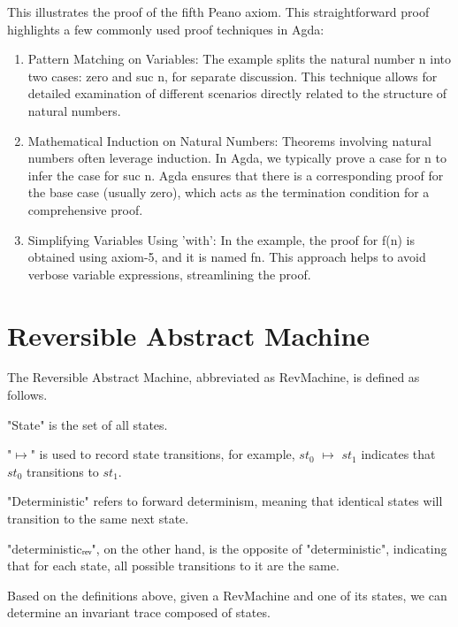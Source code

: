 
This illustrates the proof of the fifth Peano axiom. This straightforward proof highlights a few commonly used proof techniques in Agda:
\begin{enumerate}[1.]
\item Pattern Matching on Variables: The example splits the natural number n into two cases: zero and suc n, for separate discussion. This technique allows for detailed examination of different scenarios directly related to the structure of natural numbers.
\item Mathematical Induction on Natural Numbers: Theorems involving natural numbers often leverage induction. In Agda, we typically prove a case for n to infer the case for suc n. Agda ensures that there is a corresponding proof for the base case (usually zero), which acts as the termination condition for a comprehensive proof.
\item Simplifying Variables Using 'with': In the example, the proof for f(n) is obtained using axiom-5, and it is named fn. This approach helps to avoid verbose variable expressions, streamlining the proof.
\end{enumerate}

\section{Reversible Abstract Machine}

The Reversible Abstract Machine, abbreviated as RevMachine, is defined as follows.



"State" is the set of all states.

"$\mapsto$" is used to record state transitions, for example, $st_{0}$ $\mapsto$ $st_{1}$ indicates that $st_{0}$ transitions to $st_{1}$.

"Deterministic" refers to forward determinism, meaning that identical states will transition to the same next state.

"deterministicᵣₑᵥ", on the other hand, is the opposite of "deterministic", indicating that for each state, all possible transitions to it are the same.

Based on the definitions above, given a RevMachine and one of its states, we can determine an invariant trace composed of states.

